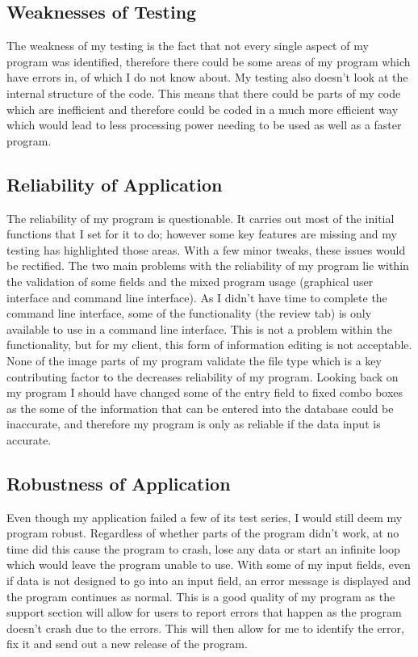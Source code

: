 \subsection{Weaknesses of Testing}

The weakness of my testing is the fact that not every single aspect of my program was identified, therefore there could be some areas of my program which have errors in, of which I do not know about. My testing also doesn't look at the internal structure of the code. This means that there could be parts of my code which are inefficient and therefore could be coded in a much more efficient way which would lead to less processing power needing to be used as well as a faster program.

\subsection{Reliability of Application} %

The reliability of my program is questionable. It carries out most of the initial functions that I set for it to do; however some key features are missing and my testing has highlighted those areas. With a few minor tweaks, these issues would be rectified. The two main problems with the reliability of my program lie within the validation of some fields and the mixed program usage (graphical user interface and command line interface). As I didn't have time to complete the command line interface, some of the functionality (the review tab) is only available to use in a command line interface. This is not a problem within the functionality, but for my client, this form of information editing is not acceptable. None of the image parts of my program validate the file type which is a key contributing factor to the decreases reliability of my program. Looking back on my program I should have changed some of the entry field to fixed combo boxes as the some of the information that can be entered into the database could be inaccurate, and therefore my program is only as reliable if the data input is accurate.

\subsection{Robustness of Application} %

Even though my application failed a few of its test series, I would still deem my program robust. Regardless of whether parts of the program didn't work, at no time did this cause the program to crash, lose any data or start an infinite loop which would leave the program unable to use. With some of my input fields, even if data is not designed to go into an input field, an error message is displayed and the program continues as normal. This is a good quality of my program as the support section will allow for users to report errors that happen as the program doesn't crash due to the errors. This will then allow for me to identify the error, fix it and send out a new release of the program.